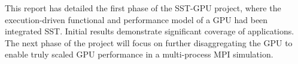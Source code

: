 This report has detailed the first phase of the SST-GPU project, where the
execution-driven functional and performance model of a GPU had been integrated
SST. Initial results demonstrate significant coverage of applications. The next phase of the project will
focus on further disaggregating the GPU to enable truly scaled GPU performance
in a multi-process MPI simulation.
